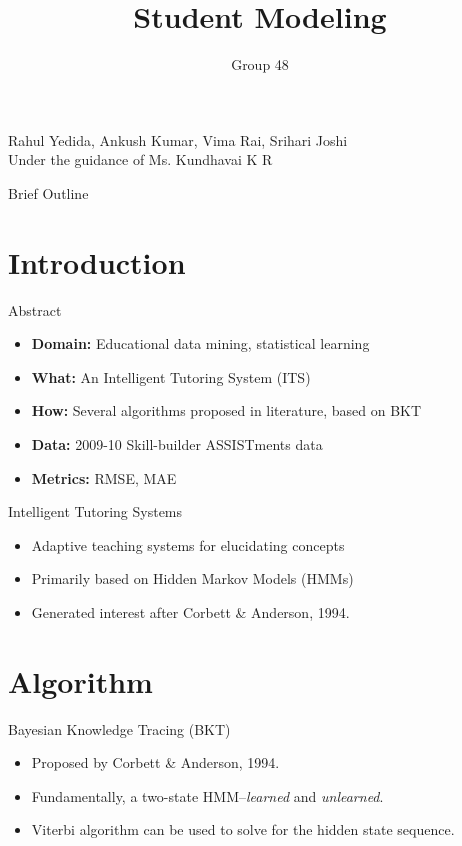 \documentclass[11pt]{beamer}
\author{Group 48}
\title{Student Modeling}
\institute{PES University, Electronic City}
\date{}
\begin{document}
\begin{frame}[plain]
	\titlepage
	\begin{scriptsize}
		Rahul Yedida, Ankush Kumar, Vima Rai, Srihari Joshi \\
		Under the guidance of Ms. Kundhavai K R
	\end{scriptsize}
\end{frame}

\begin{frame}{Brief Outline}
\tableofcontents
\end{frame}

\section{Introduction}
\begin{frame}{Abstract}
	\begin{itemize}
		\item<1-> \textbf{Domain:} Educational data mining, statistical learning
		\item<2-> \textbf{What:} An Intelligent Tutoring System (ITS)
		\item<3-> \textbf{How:} Several algorithms proposed in literature, based on BKT
		\item<4-> \textbf{Data:} 2009-10 Skill-builder ASSISTments data
		\item<5-> \textbf{Metrics:} RMSE, MAE
	\end{itemize}
\end{frame}

\begin{frame}{Intelligent Tutoring Systems}
	\begin{itemize}
		\item<1-> Adaptive teaching systems for elucidating concepts
		\item<2-> Primarily based on Hidden Markov Models (HMMs)
		\item<3-> Generated interest after Corbett \& Anderson, 1994.
	\end{itemize}
\end{frame}

\section{Algorithm}
\begin{frame}{Bayesian Knowledge Tracing (BKT)}
	\begin{itemize}
		\item<1-> Proposed by Corbett \& Anderson, 1994.
		\item<2-> Fundamentally, a two-state HMM--\textit{learned} and \textit{unlearned}.
		\item<3-> Viterbi algorithm can be used to solve for the hidden state sequence.
	\end{itemize}
\end{frame}
\end{document}
